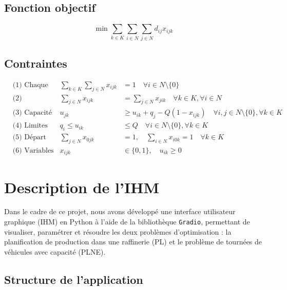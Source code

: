 \documentclass[a4paper,11pt]{article}
\begin{document}
\subsection{Fonction objectif}
\[
\min \sum_{k \in K} \sum_{i \in N} \sum_{j \in N} d_{ij} x_{ijk}
\]

\subsection{Contraintes}
\begin{align*}
&\text{(1) Chaque client est visité une seule fois :} & \sum_{k \in K} \sum_{j \in N} x_{ijk} &= 1 \quad \forall i \in N \setminus \{0\} \\
&\text{(2) Conservation de flux :} & \sum_{j \in N} x_{ijk} &= \sum_{j \in N} x_{jik} \quad \forall k \in K, \forall i \in N \\
&\text{(3) Capacité des véhicules :} & u_{jk} &\geq u_{ik} + q_j - Q (1 - x_{ijk}) \quad \forall i, j \in N \setminus \{0\}, \forall k \in K \\
&\text{(4) Limites de charge :} & q_i \leq u_{ik} &\leq Q \quad \forall i \in N \setminus \{0\}, \forall k \in K \\
&\text{(5) Départ et retour au dépôt :} & \sum_{j \in N} x_{0jk} &= 1, \quad \sum_{i \in N} x_{i0k} = 1 \quad \forall k \in K \\
&\text{(6) Variables :} & x_{ijk} &\in \{0,1\}, \quad u_{ik} \geq 0
\end{align*}

\section{Description de l'IHM}

Dans le cadre de ce projet, nous avons développé une interface utilisateur graphique (IHM) en Python à l’aide de la bibliothèque \texttt{Gradio}, permettant de visualiser, paramétrer et résoudre les deux problèmes d'optimisation : la planification de production dans une raffinerie (PL) et le problème de tournées de véhicules avec capacité (PLNE).

\subsection{Structure de l'application}
\end{document}
